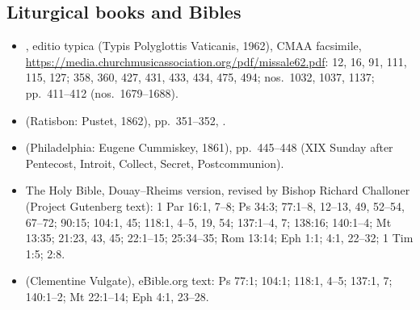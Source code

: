 {\footnotesize
\subsection*{Liturgical books and Bibles}
\begin{itemize}
\item {}, editio typica (Typis Polyglottis Vaticanis, 1962), CMAA facsimile, \url{https://media.churchmusicassociation.org/pdf/missale62.pdf}:  12, 16, 91, 111, 115, 127;  358, 360, 427, 431, 433, 434, 475, 494;  nos.~1032, 1037, 1137; pp.~411--412 (nos.~1679--1688).
\item {} (Ratisbon: Pustet, 1862), pp.~351--352, .
\item {} (Philadelphia: Eugene Cummiskey, 1861), pp.~445--448 (XIX Sunday after Pentecost, Introit, Collect, Secret, Postcommunion).
\item The Holy Bible, Douay--Rheims version, revised by Bishop Richard Challoner (Project Gutenberg text): 1 Par 16:1, 7--8; Ps 34:3; 77:1--8, 12--13, 49, 52--54, 67--72; 90:15; 104:1, 45; 118:1, 4--5, 19, 54; 137:1--4, 7; 138:16; 140:1--4; Mt 13:35; 21:23, 43, 45; 22:1--15; 25:34--35; Rom 13:14; Eph 1:1; 4:1, 22--32; 1 Tim 1:5; 2:8.
\item {} (Clementine Vulgate), eBible.org text: Ps 77:1; 104:1; 118:1, 4--5; 137:1, 7; 140:1--2; Mt 22:1--14; Eph 4:1, 23--28.
\end{itemize}

}
